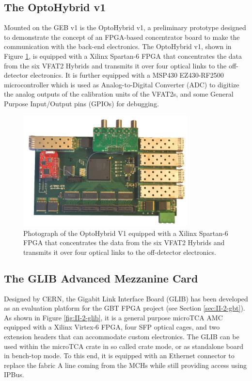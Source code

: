     \subsection{The OptoHybrid v1}

      Mounted on the GEB v1 is the OptoHybrid v1, a preliminary prototype designed to demonstrate the concept of an FPGA-based concentrator board to make the communication with the back-end electronics. The OptoHybrid v1, shown in Figure \ref{fig:II-2-ohv1}, is equipped with a Xilinx Spartan-6 FPGA that concentrates the data from the six VFAT2 Hybrids and transmits it over four optical links to the off-detector electronics. It is further equipped with a MSP430 EZ430-RF2500 \cite{MSP430} microcontroller which is used as Analog-to-Digital Converter (ADC) to digitize the analog outputs of the calibration units of the VFAT2s, and some General Purpose Input/Output pins (GPIOs) for debugging.

      \begin{figure}[b!]
        \centering
        \includegraphics[width=0.8\textwidth]{img/II-2-daq/oh-v1.jpg}
        \caption{Photograph of the OptoHybrid V1 equipped with a Xilinx Spartan-6 FPGA that concentrates the data from the six VFAT2 Hybrids and transmits it over four optical links to the off-detector electronics.}
        \label{fig:II-2-ohv1}
      \end{figure}

    \subsection{The GLIB Advanced Mezzanine Card}

      Designed by CERN, the Gigabit Link Interface Board (GLIB) \cite{Vichoudis:1359270} has been developed as an evaluation platform for the GBT FPGA project (see Section \ref{sec:II-2-gbt}). As shown in Figure \ref{fig:II-2-glib}, it is a general purpose microTCA AMC equipped with a Xilinx Virtex-6 FPGA, four SFP optical cages, and two extension headers that can accommodate custom electronics. The GLIB can be used within the microTCA crate in so called crate mode, or as standalone board in bench-top mode. To this end, it is equipped with an Ethernet connector to replace the fabric A line coming from the MCHs while still providing access using IPBus. \\

